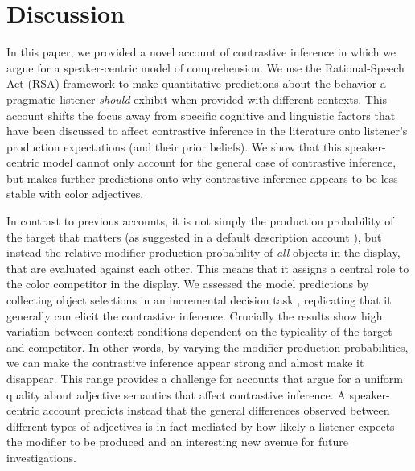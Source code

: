 \documentclass[10pt,letterpaper]{article}
\begin{document}
\section{Discussion}

In this paper, we provided a novel account of contrastive inference in which we argue for a speaker-centric model of comprehension. We use the Rational-Speech Act (RSA) framework to make quantitative predictions about the behavior a pragmatic listener \textit{should} exhibit when provided with different contexts. This account shifts the focus away from specific cognitive and linguistic factors that have been discussed to affect contrastive inference in the literature onto listener's production expectations (and their prior beliefs). We show that this speaker-centric model cannot only account for the general case of contrastive inference, but makes further predictions onto why contrastive inference appears to be less stable with color adjectives. 

In contrast to previous accounts, it is not simply the production probability of the target that matters (as suggested in a default description account \cite{Sedivy:2003}), but instead the relative modifier production probability of \emph{all} objects in the display, that are evaluated against each other. This means that it assigns a central role to the color competitor in the display. 
We assessed the model predictions by collecting object selections in an incremental decision task \cite{Qing:2018}, replicating that it generally can elicit the contrastive inference. Crucially the results show high variation between context conditions dependent on the typicality of the target and competitor. In other words, by varying the modifier production probabilities, we can make the contrastive inference appear strong and almost make it disappear. This range provides a challenge for accounts that argue for a uniform quality about adjective semantics that affect contrastive inference. A speaker-centric account predicts instead that the general differences observed between different types of adjectives is in fact mediated by how likely a listener expects the modifier to be produced and an interesting new avenue for future investigations.
\end{document}
